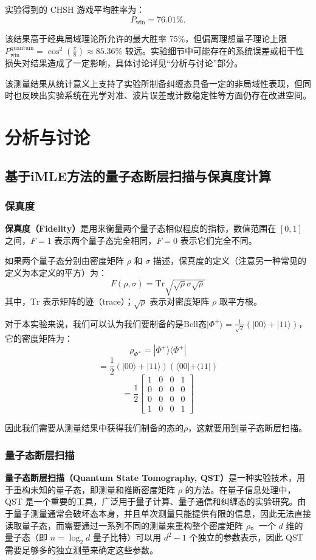 实验得到的 CHSH 游戏平均胜率为：
\[
P_\text{win} = 76.01\%.
\]

该结果高于经典局域理论所允许的最大胜率 75\%，但偏离理想量子理论上限 $P_\text{win}^\text{quantum} = \cos^2\left(\frac{\pi}{8}\right) \approx 85.36\%$ 较远。实验细节中可能存在的系统误差或相干性损失对结果造成了一定影响，具体讨论详见“分析与讨论”部分。

该测量结果从统计意义上支持了实验所制备纠缠态具备一定的非局域性表现，但同时也反映出实验系统在光学对准、波片误差或计数稳定性等方面仍存在改进空间。

\section{分析与讨论}

\subsection{基于iMLE方法的量子态断层扫描与保真度计算}

\subsubsection{保真度}
\textbf{保真度（Fidelity）}是用来衡量两个量子态相似程度的指标，数值范围在 \([0,1]\) 之间，\( F = 1 \) 表示两个量子态完全相同，\( F = 0 \) 表示它们完全不同。

如果两个量子态分别由密度矩阵 \( \rho \) 和 \( \sigma \) 描述，保真度的定义（注意另一种常见的定义为本定义的平方）为：
\[
F(\rho, \sigma) =  \text{Tr} \sqrt{\sqrt{\rho} \sigma \sqrt{\rho}} 
\]
其中，\( \text{Tr} \) 表示矩阵的迹（trace）；\( \sqrt{\rho} \) 表示对密度矩阵 \( \rho \) 取平方根。

对于本实验来说，我们可以认为我们要制备的是Bell态$|\Phi^+\rangle = \frac{1}{\sqrt{2}} (|00\rangle + |11\rangle)$，它的密度矩阵为：
\[
\rho_{\Phi^+} = |\Phi^+\rangle \langle \Phi^+|
\]
\[
= \frac{1}{2} (|00\rangle + |11\rangle)(\langle 00| + \langle 11|)
\]
\[
= \frac{1}{2} \begin{bmatrix} 
	1 & 0 & 0 & 1 \\ 
	0 & 0 & 0 & 0 \\ 
	0 & 0 & 0 & 0 \\ 
	1 & 0 & 0 & 1
\end{bmatrix}
\]

因此我们需要从测量结果中获得我们制备的态的$\rho$，这就要用到量子态断层扫描。

\subsubsection{量子态断层扫描}
\textbf{量子态断层扫描（Quantum State Tomography, QST）}是一种实验技术，用于重构未知的量子态，即测量和推断密度矩阵 \( \rho \) 的方法。在量子信息处理中，QST 是一个重要的工具，广泛用于量子计算、量子通信和纠缠态的实验研究。由于量子测量通常会破坏态本身，并且单次测量只能提供有限的信息，因此无法直接读取量子态，而需要通过一系列不同的测量来重构整个密度矩阵 \( \rho \)。一个 \( d \) 维的量子态（即 \( n = \log_2 d \) 量子比特）可以用 \( d^2 - 1 \) 个独立的参数表示，因此 QST 需要足够多的独立测量来确定这些参数。  

